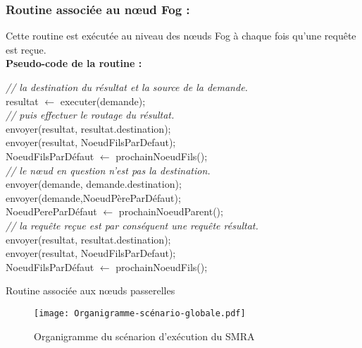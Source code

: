 \subsubsection{Routine associée au nœud Fog :}
Cette routine est exécutée au niveau des nœuds Fog à chaque fois qu'une requête est reçue.\\
\textbf{Pseudo-code de la routine :}\\
\begin{algorithm}[H]
  {  
    { 
      \emph{// la destination du résultat et la source de la demande.}\\
      resultat $\gets$ executer(demande);\\
      \emph{// puis effectuer le routage du résultat.}\\
      {
        envoyer(resultat, resultat.destination);\\
      }
      {
        envoyer(resultat, NoeudFilsParDefaut);\\
        NoeudFilsParDéfaut $\gets$ prochainNoeudFils();\\
      }
    }
    {  
      \emph{// le nœud en question n'est pas la destination.}\\
      {
        envoyer(demande, demande.destination);\\
      }
      {
        envoyer(demande,NoeudPèreParDéfaut);\\
        NoeudPereParDéfaut $\gets$ prochainNoeudParent();\\
      }
    }
  }
  {
    \emph{// la requête reçue est par conséquent une requête résultat.}\\
    {
      envoyer(resultat, resultat.destination);\\
    }
    {
      envoyer(resultat, NoeudFilsParDefaut);\\
      NoeudFilsParDéfaut $\gets$ prochainNoeudFils();\\
    }
  }
  \caption{Routine associée aux nœuds passerelles}
\end{algorithm}
\begin{figure}[H]
    \centering
    \texttt{[image: Organigramme-scénario-globale.pdf]}
    \caption{Organigramme du scénarion d'exécution du SMRA}
    \label{fig:Organigrame_scénario_globale}
\end{figure}

